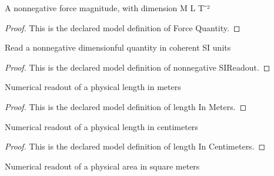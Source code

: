 \begin{definition}
  \label{def:physics:phyx-mini-0723:phyxminiproblems-problemphyxmini0723-forcequantity}
  A nonnegative force magnitude, with dimension M L T⁻²
\end{definition}
\begin{proof}
  This is the declared model definition of Force Quantity.
\end{proof}
\begin{definition}
  \label{def:physics:phyx-mini-0723:phyxminiproblems-problemphyxmini0723-nonnegativesireadout}
  Read a nonnegative dimensionful quantity in coherent SI units
\end{definition}
\begin{proof}
  This is the declared model definition of nonnegative SIReadout.
\end{proof}
\begin{definition}
  \label{def:physics:phyx-mini-0723:phyxminiproblems-problemphyxmini0723-lengthinmeters}
  Numerical readout of a physical length in meters
\end{definition}
\begin{proof}
  This is the declared model definition of length In Meters.
\end{proof}
\begin{definition}
  \label{def:physics:phyx-mini-0723:phyxminiproblems-problemphyxmini0723-lengthincentimeters}
  Numerical readout of a physical length in centimeters
\end{definition}
\begin{proof}
  This is the declared model definition of length In Centimeters.
\end{proof}
\begin{definition}
  \label{def:physics:phyx-mini-0723:phyxminiproblems-problemphyxmini0723-areainsquaremeters}
  Numerical readout of a physical area in square meters
\end{definition}
